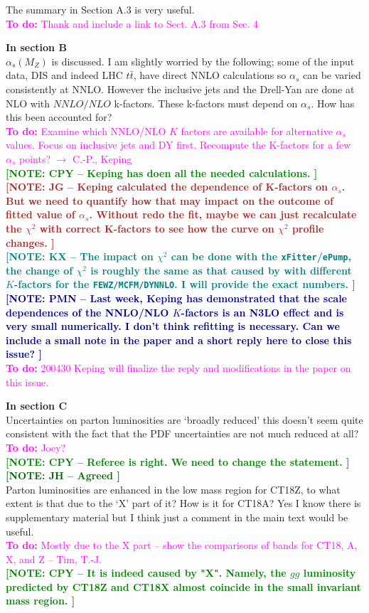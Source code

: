\documentclass[aps,prd,amsmath,nofootinbib,floatfix,fleqn]{revtex4}
\newcommand{\TODO}[1]{\textcolor{magenta}{
\quad\vspace{3pt} \\ {\bf To do:} #1 \\
}}
\newcommand{\NOTECPY}[1]{\textcolor{green}{ \bf[NOTE: CPY -- #1 ]}}
\newcommand{\NOTEJH}[1]{\textcolor{darkgreen}{ \bf[NOTE: JH -- #1 ]}}
\newcommand{\NOTEPN}[1]{\textcolor{darkblue}{ \bf[NOTE: PMN -- #1 ]}}
\newcommand{\NOTEJG}[1]{\textcolor{brown}{ \bf[NOTE: JG -- #1 ]}}
\newcommand{\NOTEKX}[1]{\textcolor{teal}{ \bf[NOTE: KX -- #1 ]}}
\begin{document}
\noindent
The summary in Section A.3 is very useful.
\TODO{Thank and include a link to Sect. A.3 from Sec. 4}

\noindent
{\bf In section B}\\
 $\alpha_s(M_Z)$ is discussed. I am slightly worried by the following; some of the input data, DIS and indeed LHC $t\bar t$, have direct NNLO calculations so $\alpha_s$ can be varied consistently at NNLO. However the inclusive jets and the Drell-Yan are done at NLO with $NNLO/NLO$ k-factors. These k-factors must depend on $\alpha_s$. How has this been accounted for?
 \TODO{Examine which NNLO/NLO $K$ factors are available for alternative $\alpha_s$ values. Focus on inclusive jets and DY first. Recompute the K-factors for a few $\alpha_s$ points? $\to$ C.-P., Keping}
 \NOTECPY{Keping has doen all the needed calculations.}\\
 \NOTEJG{Keping calculated the dependence of K-factors on $\alpha_s$. But we need to quantify how that may impact on the outcome of fitted
 value of $\alpha_s$. Without redo the fit, maybe we can just recalculate the $\chi^2$ with correct K-factors to see how the curve on $\chi^2$ profile changes.}\\
 \NOTEKX{The impact on $\chi^2$ can be done with the \texttt{xFitter}/\texttt{ePump},  the change of $\chi^2$ is roughly the same as that caused by with different  $K$-factors for the \texttt{FEWZ/MCFM/DYNNLO}. I will provide the exact numbers.}
 \NOTEPN{Last week, Keping has demonstrated that the scale dependences of the NNLO/NLO $K$-factors is an N3LO effect and is very small numerically. I don't think refitting is necessary. Can we include a small note in the paper and a short reply here to close this issue?}
\TODO{200430 Keping will finalize the reply and modifications in the paper on this issue.}

\noindent
{\bf In section C}\\
Uncertainties on parton luminosities are ‘broadly reduced’ this doesn’t seem quite consistent with the fact that the PDF uncertainties are not much reduced at all?
\TODO{Joey?}
\NOTECPY{Referee is right. We need to change the statement.}\\
\NOTEJH{Agreed}\\

\noindent
Parton luminosities are enhanced in the low mass region for CT18Z, to what extent is that due to the ‘X’ part of it? How is it for CT18A? Yes I know there is supplementary material but I think just a comment in the main text would be useful. \TODO{Mostly due to the X part -- show the comparisons of bands for CT18, A, X, and Z -- Tim, T.-J.}
\NOTECPY{It is indeed caused by "X". Namely, the $gg$ luminosity predicted by CT18Z and CT18X almost coincide in the small invariant mass region.}\\
\end{document}
